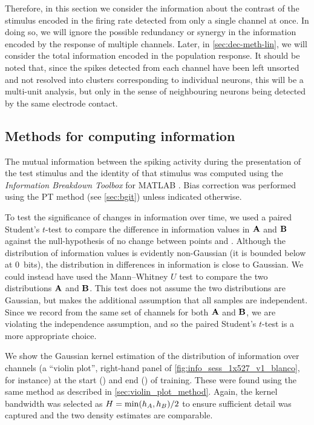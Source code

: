 Therefore, in this section we consider the information about the contrast of the stimulus encoded in the firing rate detected from only a single channel at once.
In doing so, we will ignore the possible redundancy or synergy in the information encoded by the response of multiple channels.
Later, in \autoref{sec:dec-meth-lin}, we will consider the total information encoded in the population response.
It should be noted that, since the spikes detected from each channel have been left unsorted and not resolved into clusters corresponding to individual neurons, this will be a multi-unit analysis, but only in the sense of neighbouring neurons being detected by the same electrode contact.


\subsection{Methods for computing information}
\label{sec:info-methods}

The mutual information between the spiking activity during the presentation of the test stimulus and the identity of that stimulus was computed using the \textit{Information Breakdown Toolbox} for MATLAB \citep{Magri2009}.
Bias correction was performed using the \ac{PT} method (see \autoref{sec:bgit}) unless indicated otherwise.

To test the significance of changes in information over time, we used a paired Student's $t$-test to compare the difference in information values in $\mathbf{A}$ and $\mathbf{B}$ against the null-hypothesis of no change between points  and .
Although the distribution of information values is evidently non-Gaussian (it is bounded below at \SI{0}{bits}), the distribution in differences in information is close to Gaussian.
We could instead have used the Mann--Whitney $U$ test to compare the two distributions $\mathbf{A}$ and $\mathbf{B}$.
This test does not assume the two distributions are Gaussian, but makes the additional assumption that all samples are independent.
Since we record from the same set of channels for both $\mathbf{A}$ and $\mathbf{B}$, we are violating the independence assumption, and so the paired Student's $t$-test is a more appropriate choice.

We show the Gaussian kernel estimation of the distribution of information over channels (a ``violin plot'', right-hand panel of \autoref{fig:info_sess_1x527_v1_blanco}, for instance) at the start () and end () of training.
These were found using the same method as described in \autoref{sec:violin_plot_method}.
Again, the kernel bandwidth was selected as
$H = \min(h_{A}, h_{B}) / 2$
to ensure sufficient detail was captured and the two density estimates are comparable.


